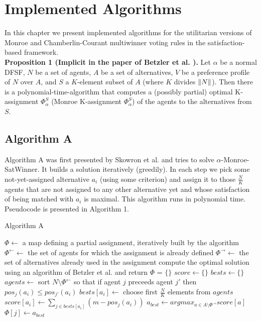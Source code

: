 \chapter{Implemented Algorithms}
\label{cha:implementedAlgorithms}

In this chapter we present implemented algorithms for the utilitarian versions of Monroe and Chamberlin-Courant multiwinner voting rules in the satisfaction-based framework.
\\

\noindent
\textbf{Proposition 1 (Implicit in the paper of Betzler et al. \cite{3}).} Let $\alpha$ be a normal DFSF, $N$ be a set of agents, $A$ be a set of alternatives, $V$ be a preference profile of $N$ over $A$, and $S$ a $K$-element subset of $A$ (where $K$ divides $\lVert N\rVert$). Then there is a polynomial-time-algorithm that computes a (possibly partial) optimal K-assignment $\Phi^{S}_{\alpha}$ (Monroe K-assignment $\Phi^{S}_{\alpha}$) of the agents to the alternatives from $S$.
\\

\section{Algorithm A}

Algorithm A was first presented by Skowron et al. \cite{1} and tries to solve $\alpha$-Monroe-SatWinner. It builds a solution iteratively (greedily). In each step we pick some not-yet-assigned alternative $a_{i}$ (using some criterion) and assign it to those $\frac{N}{K}$ agents that are not assigned to any other alternative yet and whose satisfaction of being matched with $a_{i}$ is maximal. This algorithm runs in polynomial time. Pseudocode is presented in Algorithm 1.

\begin{algorithm}
\caption{Algorithm A}\label{euclid}
\begin{algorithmic}[1]
		\State $\Phi \gets$ a map defining a partial assignment, iteratively built by the algorithm
		\State $\Phi^{\leftarrow} \gets$ the set of agents for which the assignment is already defined
		\State $\Phi^{\rightarrow} \gets$ the set of alternatives already used in the assignment
			\State compute the optimal solution using an algorithm of Betzler et al. \cite{1} and return
		\EndIf
		\State $\Phi$ = $\{\}$
			\State $score \gets \{\}$
			\State $bests \gets \{\}$
				\State $agents \gets$ sort $N \setminus \Phi^{\leftarrow}$ so that if agent $j$ preceeds agent $j'$ then $pos_{j}(a_{i}) \leq pos_{j'}(a_{i})$
				\State $bests[a_{i}] \gets$ choose first $\frac{N}{K}$ elements from $agents$
				\State $score[a_{i}] \gets \sum_{j \in bests[a_{i}]}(m - pos_{j}(a_{i}))$
			\EndFor
			\State $a_{best} \gets argmax_{a \in A \setminus \Phi^{\rightarrow}} score[a]$
				\State $\Phi[j] \gets a_{best}$
			\EndFor
		\EndFor
	\EndProcedure
\end{algorithmic}
\end{algorithm}

